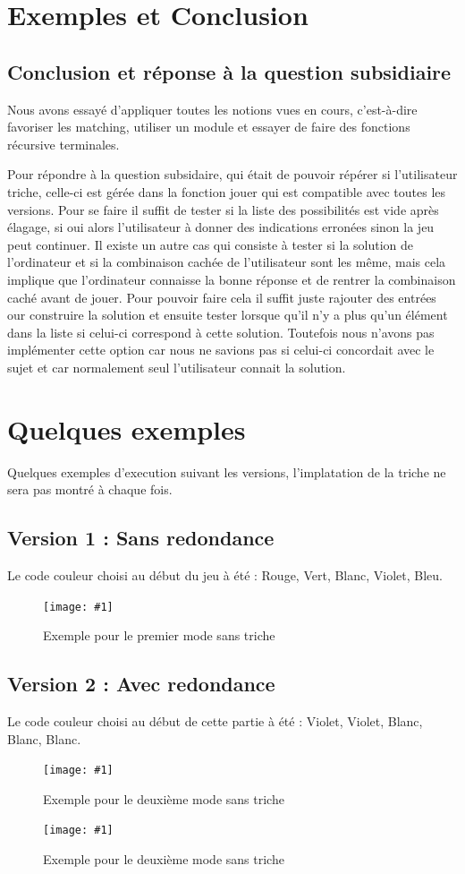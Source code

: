 \documentclass[a4paper,twoside,12pt]{report}
\newcommand{\monimage}[3]{
\par\noindent
\begin{figure}[H] %
\begin{center}
\texttt{[image: \#1]} %
\caption{#2} %
\label{#3} %
\end{center}
\end{figure} %
}
\begin{document}
\chapter{Exemples et Conclusion}
%
\section{Conclusion et réponse à la question subsidiaire}
\par Nous avons essayé d'appliquer toutes les notions vues en cours, c'est-à-dire favoriser les matching, utiliser un module et essayer de faire des fonctions récursive terminales.
\par Pour répondre à la question subsidaire, qui était de pouvoir répérer si l'utilisateur triche, celle-ci est gérée dans la fonction jouer qui est compatible avec toutes les versions. Pour se faire il suffit de tester si la liste des possibilités est vide après élagage, si oui alors l'utilisateur à donner des indications erronées sinon la jeu peut continuer. Il existe un autre cas qui consiste à tester si la solution de l'ordinateur et si la combinaison cachée de l'utilisateur sont les même, mais cela implique que l'ordinateur connaisse la bonne réponse et de rentrer la combinaison caché avant de jouer. Pour pouvoir faire cela il suffit juste rajouter des entrées our construire la solution et ensuite tester lorsque qu'il n'y a plus qu'un élément dans la liste si celui-ci correspond à cette solution. Toutefois nous n'avons pas implémenter cette option car nous ne savions pas si celui-ci concordait avec le sujet et car normalement seul l'utilisateur connait la solution.

\chapter*{Quelques exemples}
Quelques exemples d'execution suivant les versions, l'implatation de la triche ne sera pas montré à chaque fois.
\section*{Version 1 : Sans redondance}
Le code couleur choisi au début du jeu à été : Rouge, Vert, Blanc, Violet, Bleu.
\monimage{mode1sanstriche.png}{Exemple pour le premier mode sans triche}{M1ST}
\section*{Version 2 : Avec redondance}
Le code couleur choisi au début de cette partie à été : Violet, Violet, Blanc, Blanc, Blanc.
\monimage{mode2sanstriche_1.png}{Exemple pour le deuxième mode sans triche}{M2ST}
\monimage{mode2sanstriche_2.png}{Exemple pour le deuxième mode sans triche}{M2ST}
\end{document}
